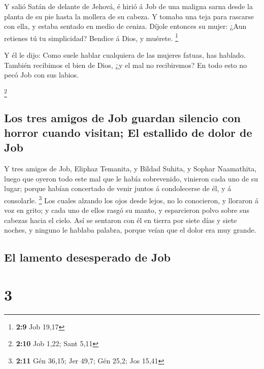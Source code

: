  Y salió Satán de delante de Jehová, é hirió á Job de una
maligna sarna desde la planta de su pie hasta la mollera de su cabeza.
 Y tomaba una teja para rascarse con ella, y estaba
sentado en medio de ceniza.  Díjole entonces su mujer:
¿Aun retienes tú tu simplicidad? Bendice á Dios, y muérete. \footnote{\textbf{2:9}
  Job 19,17}

 Y él le dijo: Como suele hablar cualquiera de las
mujeres fatuas, has hablado. También recibimos el bien de Dios, ¿y el
mal no recibiremos? En todo esto no pecó Job con sus labios.

\footnote{\textbf{2:10} Job 1,22; Sant 5,11}

\hypertarget{los-tres-amigos-de-job-guardan-silencio-con-horror-cuando-visitan-el-estallido-de-dolor-de-job}{%
\subsection{Los tres amigos de Job guardan silencio con horror cuando
visitan; El estallido de dolor de
Job}\label{los-tres-amigos-de-job-guardan-silencio-con-horror-cuando-visitan-el-estallido-de-dolor-de-job}}

 Y tres amigos de Job, Eliphaz Temanita, y Bildad Suhita,
y Sophar Naamathita, luego que oyeron todo este mal que le había
sobrevenido, vinieron cada uno de su lugar; porque habían concertado de
venir juntos á condolecerse de él, y á consolarle. \footnote{\textbf{2:11}
  Gén 36,15; Jer 49,7; Gén 25,2; Jos 15,41}  Los cuales
alzando los ojos desde lejos, no lo conocieron, y lloraron á voz en
grito; y cada uno de ellos rasgó su manto, y esparcieron polvo sobre sus
cabezas hacia el cielo.  Así se sentaron con él en tierra
por siete días y siete noches, y ninguno le hablaba palabra, porque
veían que el dolor era muy grande.

\hypertarget{el-lamento-desesperado-de-job}{%
\subsection{El lamento desesperado de
Job}\label{el-lamento-desesperado-de-job}}

\hypertarget{section-2}{%
\section{3}\label{section-2}}

